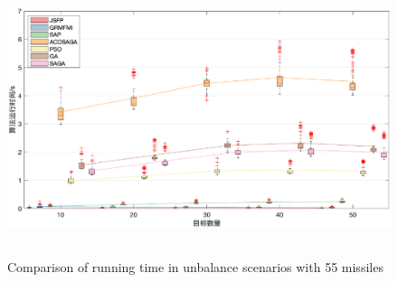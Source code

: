 \begin{figure}[!htp]
  \centering
  \includegraphics[height=8cm]{potential_game/BoxM55T10-50Time}
    {Comparison of running time in unbalance scenarios with 55 missiles}
  \label{fig:unbalance_time}
\end{figure}



